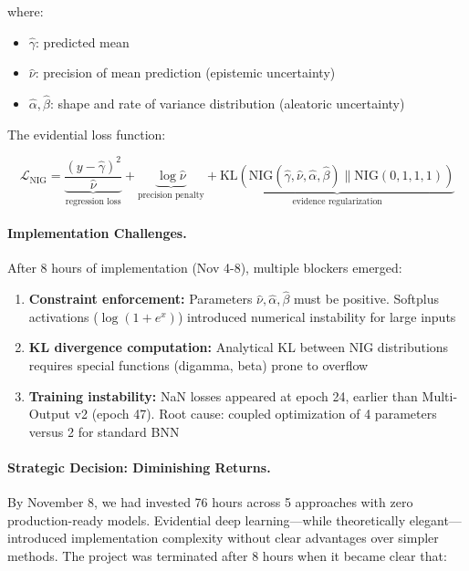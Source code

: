where:
\begin{itemize}[itemsep=2pt,parsep=0pt]
    \item $\hat{\gamma}$: predicted mean
    \item $\hat{\nu}$: precision of mean prediction (epistemic uncertainty)
    \item $\hat{\alpha}, \hat{\beta}$: shape and rate of variance distribution (aleatoric uncertainty)
\end{itemize}

The evidential loss function:

\begin{equation}
\mathcal{L}_{\text{NIG}} = \underbrace{\frac{(y - \hat{\gamma})^2}{\hat{\nu}}}_{\text{regression loss}} + \underbrace{\log \hat{\nu}}_{\text{precision penalty}} + \underbrace{\text{KL}(\text{NIG}(\hat{\gamma}, \hat{\nu}, \hat{\alpha}, \hat{\beta}) \| \text{NIG}(0, 1, 1, 1))}_{\text{evidence regularization}}
\end{equation}

\paragraph{Implementation Challenges.}
After 8 hours of implementation (Nov 4-8), multiple blockers emerged:

\begin{enumerate}[itemsep=2pt,parsep=0pt]
    \item \textbf{Constraint enforcement:} Parameters $\hat{\nu}, \hat{\alpha}, \hat{\beta}$ must be positive. Softplus activations ($\log(1 + e^x)$) introduced numerical instability for large inputs
    \item \textbf{KL divergence computation:} Analytical KL between NIG distributions requires special functions (digamma, beta) prone to overflow
    \item \textbf{Training instability:} NaN losses appeared at epoch 24, earlier than Multi-Output v2 (epoch 47). Root cause: coupled optimization of 4 parameters versus 2 for standard BNN
\end{enumerate}

\paragraph{Strategic Decision: Diminishing Returns.}
By November 8, we had invested 76 hours across 5 approaches with zero production-ready models. Evidential deep learning---while theoretically elegant---introduced implementation complexity without clear advantages over simpler methods. The project was terminated after 8 hours when it became clear that:

